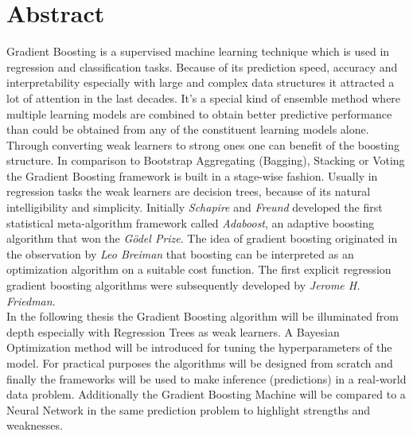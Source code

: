 \documentclass[12pt, a4paper]{article}
\begin{document}
\section*{Abstract}
Gradient Boosting is a supervised machine learning technique which is used in regression and classification tasks. Because of its prediction speed, accuracy and interpretability especially with large and complex data structures it attracted a lot of attention in the last decades. It's a special kind of ensemble method where multiple learning models are combined to obtain better predictive performance than could be obtained from any of the constituent learning models alone. Through converting weak learners to strong ones one can benefit of the boosting structure. In comparison to Bootstrap Aggregating (Bagging), Stacking or Voting the Gradient Boosting framework is built in a stage-wise fashion. Usually in regression tasks the weak learners are decision trees, because of its natural intelligibility and simplicity. Initially \textit{Schapire} and \textit{Freund} developed the first statistical meta-algorithm framework called \textit{Adaboost}, an adaptive boosting algorithm that won the \textit{Gödel Prize}. The idea of gradient boosting originated in the observation by \textit{Leo Breiman} that boosting can be interpreted as an optimization algorithm on a suitable cost function. The first explicit regression gradient boosting algorithms were subsequently developed by \textit{Jerome H. Friedman}. \\
In the following thesis the Gradient Boosting algorithm will be illuminated from depth especially with Regression Trees as weak learners. A Bayesian Optimization method will be introduced for tuning the hyperparameters of the model. For practical purposes the algorithms will be designed from scratch and finally the frameworks will be used to make inference (predictions) in a real-world data problem. Additionally the Gradient Boosting Machine will be compared to a Neural Network in the same prediction problem to highlight strengths and weaknesses.
\clearpage
\thispagestyle{empty}
\tableofcontents
\newpage
\clearpage
\setcounter{page}{1}
\end{document}
